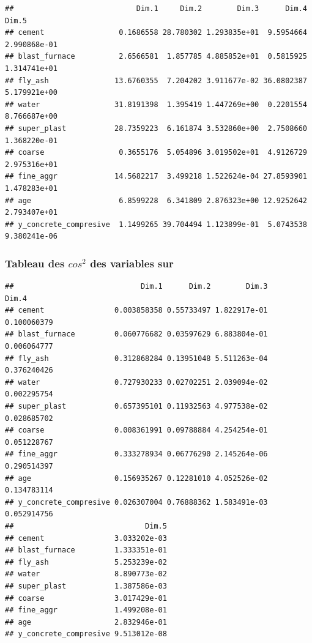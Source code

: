 \documentclass[
  12pt,
]{article}
\newenvironment{Shaded}{\begin{snugshade}}{\end{snugshade}}
\newcommand{\AttributeTok}[1]{\textcolor[rgb]{0.13,0.29,0.53}{#1}}
\newcommand{\CommentTok}[1]{\textcolor[rgb]{0.56,0.35,0.01}{\textit{#1}}}
\newcommand{\FloatTok}[1]{\textcolor[rgb]{0.00,0.00,0.81}{#1}}
\newcommand{\FunctionTok}[1]{\textcolor[rgb]{0.13,0.29,0.53}{\textbf{#1}}}
\newcommand{\NormalTok}[1]{#1}
\newcommand{\OtherTok}[1]{\textcolor[rgb]{0.56,0.35,0.01}{#1}}
\newcommand{\SpecialCharTok}[1]{\textcolor[rgb]{0.81,0.36,0.00}{\textbf{#1}}}
\begin{document}
\begin{verbatim}
##                            Dim.1     Dim.2        Dim.3      Dim.4        Dim.5
## cement                 0.1686558 28.780302 1.293835e+01  9.5954664 2.990868e-01
## blast_furnace          2.6566581  1.857785 4.885852e+01  0.5815925 1.314741e+01
## fly_ash               13.6760355  7.204202 3.911677e-02 36.0802387 5.179921e+00
## water                 31.8191398  1.395419 1.447269e+00  0.2201554 8.766687e+00
## super_plast           28.7359223  6.161874 3.532860e+00  2.7508660 1.368220e-01
## coarse                 0.3655176  5.054896 3.019502e+01  4.9126729 2.975316e+01
## fine_aggr             14.5682217  3.499218 1.522624e-04 27.8593901 1.478283e+01
## age                    6.8599228  6.341809 2.876323e+00 12.9252642 2.793407e+01
## y_concrete_compresive  1.1499265 39.704494 1.123899e-01  5.0743538 9.380241e-06
\end{verbatim}

\subsubsection{\texorpdfstring{Tableau des \(cos^2\) des variables
sur}{Tableau des cos\^{}2 des variables sur}}\label{tableau-des-cos2-des-variables-sur}

\begin{Shaded}
\end{Shaded}

\begin{verbatim}
##                             Dim.1      Dim.2        Dim.3       Dim.4
## cement                0.003858358 0.55733497 1.822917e-01 0.100060379
## blast_furnace         0.060776682 0.03597629 6.883804e-01 0.006064777
## fly_ash               0.312868284 0.13951048 5.511263e-04 0.376240426
## water                 0.727930233 0.02702251 2.039094e-02 0.002295754
## super_plast           0.657395101 0.11932563 4.977538e-02 0.028685702
## coarse                0.008361991 0.09788884 4.254254e-01 0.051228767
## fine_aggr             0.333278934 0.06776290 2.145264e-06 0.290514397
## age                   0.156935267 0.12281010 4.052526e-02 0.134783114
## y_concrete_compresive 0.026307004 0.76888362 1.583491e-03 0.052914756
##                              Dim.5
## cement                3.033202e-03
## blast_furnace         1.333351e-01
## fly_ash               5.253239e-02
## water                 8.890773e-02
## super_plast           1.387586e-03
## coarse                3.017429e-01
## fine_aggr             1.499208e-01
## age                   2.832946e-01
## y_concrete_compresive 9.513012e-08
\end{verbatim}
\end{document}
